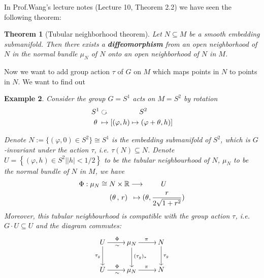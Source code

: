 \documentclass[reqno,11pt]{amsart}
\numberwithin{equation}{section}
\theoremstyle{plain}
\newtheorem{theorem}{Theorem}[section]
\newtheorem{eg}[theorem]{Example}
\theoremstyle{plain}
\numberwithin{equation}{section}
\theoremstyle{remark}
\begin{document}
In Prof.Wang's lecture notes \cite{ZW1} (Lecture 10, Theorem 2.2) we have seen the following theorem:
\begin{theorem}[Tubular neighborhood theorem]\label{thm:main}
	Let $N \subseteq M$ be a smooth embedding submanifold.
	Then there exists a \textbf{diffeomorphism} from an open neighborhood of $N$ in the normal bundle $\mu_N$ of $N$ onto an open neighborhood of $N$ in $M$.
\end{theorem}
  Now we want to add group action $\tau$ of $G$ on $M$ which maps points in $N$ to points in $N$. We want to find out
  \begin{center}
  \end{center} 
\begin{eg}
	Consider the group $G=S^1$ acts on $M=S^2$ by rotation
	\begin{equation*}
	\begin{aligned}
		S^1 &\text{ \rotatebox[origin=c]{270}{$\circlearrowleft$} }\hspace{1.5cm} S^2\\
		\theta\; &\mapsto [(\varphi,h)\mapsto(\varphi+\theta,h)]
	\end{aligned}
	\end{equation*}
	
Denote $N:=\{(\varphi,0) \in S^2\} \cong S^1$ is the embedding submanifold of $S^2$, which is $G$-invariant under the action $\tau$, i.e.
$\tau (N) \subseteq N$.
Denote $U=\left\{(\varphi,h)\in S^2 \big| |h| < 1/2\right\}$ to be the tubular neighbourhood of $N$, $\mu_N$ to be the normal bundle of $N$ in $M$, we have
	\begin{equation*}
	\begin{aligned}
	\Phi:\mu_N \cong N \times \mathbb{R} &\longrightarrow \hspace{0.8cm} U\\
	(\theta\,,\,r)\; &\;\mapsto (\theta,\frac{r}{2\sqrt{1+r^2}})
	\end{aligned}
	\end{equation*}
	Moreover, this tubular neighbourhood is compatible with the group action $\tau$, i.e. $G \cdot U \subseteq U$ and the diagram commutes:
\begin{equation*}
	\SelectTips{eu}{12}
		\xymatrix{
		U\ar[r]_{\sim}^{\Phi}\ar[d]_{\tau_g} & \mu_N\ar[r]^{\pi}\ar[d]^{(\tau_g)_*} & N\ar[d]^{\tau_g} \\
		U\ar[r]_{\sim}^{\Phi} & \mu_N\ar[r]^{\pi} & N	
	}
\end{equation*}
\end{eg}
\end{document}
